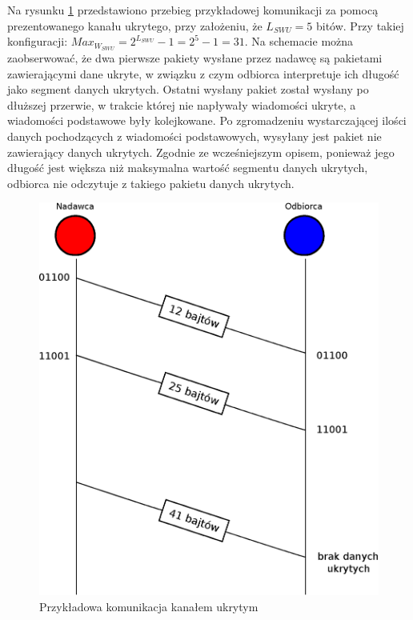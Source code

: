 \documentclass[a4paper, twoside, 12pt]{report}
\begin{document}
    Na rysunku \ref{COMMUNICATION} przedstawiono przebieg przykładowej komunikacji
    za pomocą prezentowanego kanału ukrytego, przy założeniu, że \( L_{SWU} = 5 \) bitów.
    Przy takiej konfiguracji:
    \begin{math}
        Max_{W_{SWU}} = 2^{L_{SWU}} - 1 = 2^5 - 1 = 31
    \end{math}.
    Na schemacie można zaobserwować, że dwa pierwsze pakiety wysłane przez nadawcę
    są pakietami zawierającymi dane ukryte, w związku z czym odbiorca interpretuje
    ich długość jako segment danych ukrytych. Ostatni wysłany pakiet został wysłany
    po dłuższej przerwie, w trakcie której nie napływały wiadomości ukryte, a wiadomości
    podstawowe były kolejkowane. Po zgromadzeniu wystarczającej ilości danych pochodzących
    z wiadomości podstawowych, wysyłany jest pakiet nie zawierający danych ukrytych.
    Zgodnie ze wcześniejszym opisem, ponieważ jego długość jest większa niż maksymalna
    wartość segmentu danych ukrytych, odbiorca nie odczytuje z takiego pakietu
    danych ukrytych.
        \begin{figure}[h]
                \centering
                \includegraphics[scale=0.85]{komunikacja_kanalem_ukrytym_gotowa}
                \caption{Przykładowa komunikacja kanałem ukrytym}
                \label{COMMUNICATION}
        \end{figure}
\end{document}
